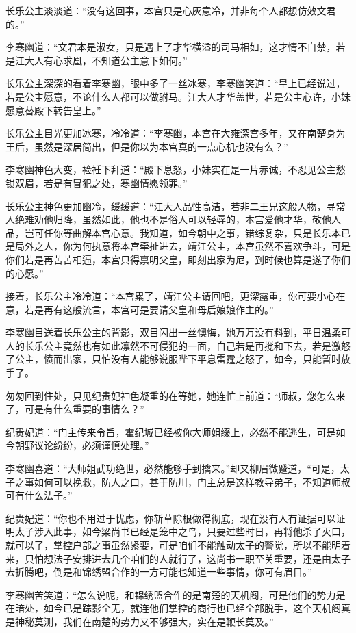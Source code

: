 长乐公主淡淡道：“没有这回事，本宫只是心灰意冷，并非每个人都想仿效文君的。”

李寒幽道：“文君本是淑女，只是遇上了才华横溢的司马相如，这才情不自禁，若是江大人有心求凰，不知道公主意下如何。”

长乐公主深深的看着李寒幽，眼中多了一丝冰寒，李寒幽笑道：“皇上已经说过，若是公主愿意，不论什么人都可以做驸马。江大人才华盖世，若是公主心许，小妹愿意替殿下转告皇上。”

长乐公主目光更加冰寒，冷冷道：“李寒幽，本宫在大雍深宫多年，又在南楚身为王后，虽然是深居简出，但是你以为本宫真的一点心机也没有么？”

李寒幽神色大变，裣衽下拜道：“殿下息怒，小妹实在是一片赤诚，不忍见公主愁锁双眉，若是有冒犯之处，寒幽情愿领罪。”

长乐公主神色更加幽冷，缓缓道：“江大人品性高洁，若非二王兄这般人物，寻常人绝难劝他归降，虽然如此，他也不是俗人可以轻辱的，本宫爱他才华，敬他人品，岂可任你等曲解本宫心意。我知道，如今朝中之事，错综复杂，只是长乐本已是局外之人，你为何执意将本宫牵扯进去，靖江公主，本宫虽然不喜欢争斗，可是你们若是再苦苦相逼，本宫只得禀明父皇，即刻出家为尼，到时候也算是遂了你们的心愿。”

接着，长乐公主冷冷道：“本宫累了，靖江公主请回吧，更深露重，你可要小心在意，若是再有这般流言，本宫可是要请父皇和母后娘娘作主的。”

李寒幽目送着长乐公主的背影，双目闪出一丝懊悔，她万万没有料到，平日温柔可人的长乐公主竟然也有如此凛然不可侵犯的一面，自己若是再搅和下去，若是激怒了公主，愤而出家，只怕没有人能够说服陛下平息雷霆之怒了，如今，只能暂时放手了。

匆匆回到住处，只见纪贵妃神色凝重的在等她，她连忙上前道：“师叔，您怎么来了，可是有什么重要的事情么？”

纪贵妃道：“门主传来令旨，霍纪城已经被你大师姐缀上，必然不能逃生，可是如今朝野议论纷纷，必须谨慎处理。”

李寒幽喜道：“大师姐武功绝世，必然能够手到擒来。”却又柳眉微蹙道，“可是，太子之事如何可以挽救，防人之口，甚于防川，门主总是这样教导弟子，不知道师叔可有什么法子。”

纪贵妃道：“你也不用过于忧虑，你斩草除根做得彻底，现在没有人有证据可以证明太子涉入此事，如今梁尚书已经是笼中之鸟，只要过些时日，再将他杀了灭口，就可以了，掌控户部之事虽然紧要，可是咱们不能触动太子的警觉，所以不能明着来，只怕想法子安排进去几个咱们的人就行了，这尚书一职至关重要，还是由太子去折腾吧，倒是和锦绣盟合作的一方可能也知道一些事情，你可有眉目。”

李寒幽苦笑道：“怎么说呢，和锦绣盟合作的是南楚的天机阁，可是他们的势力是在暗处，如今已是踪影全无，就连他们掌控的商行也已经全部脱手，这个天机阁真是神秘莫测，我们在南楚的势力又不够强大，实在是鞭长莫及。”

